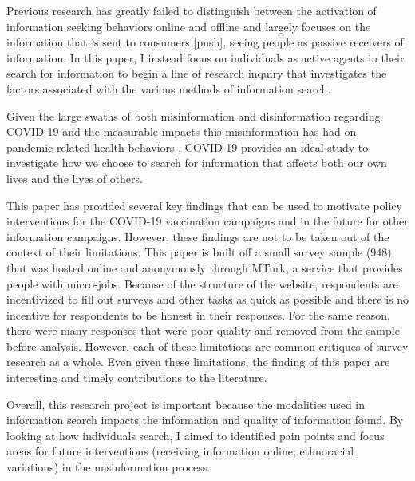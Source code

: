 Previous research has greatly failed to distinguish between the activation of
information seeking behaviors online and offline and largely focuses on the
information that is sent to consumers [push], seeing people as passive receivers
of information. In this paper, I instead focus on individuals as active agents
in their search for information to begin a line of research inquiry that
investigates the factors associated with the various methods of information
search.

Given the large swaths of both misinformation and disinformation regarding
COVID-19 \citep{pathakInfodemicsCOVID19Role2020, mottaHowRightLeaningMedia2020, shahsavariConspiracyTimeCorona2020} 
and the measurable impacts this misinformation has had on pandemic-related health behaviors
\citep{loombaMeasuringImpactCOVID192021, greene_murphy21}, COVID-19 provides an ideal study to
investigate how we choose to search for information that affects both our own
lives and the lives of others.

This paper has provided several key findings that can be used to motivate policy
interventions for the COVID-19 vaccination campaigns and in the future for other
information campaigns. However, these findings are not to be taken out of the
context of their limitations. This paper is built off a small survey sample (948)
that was hosted online and anonymously through MTurk, a service
that provides people with micro-jobs. Because of the structure of the website,
respondents are incentivized to fill out surveys and other tasks 
as quick as possible and there is no incentive for respondents to be honest
in their responses. For the same reason, there were many responses that 
were poor quality and removed from the sample before analysis.
However, each of these limitations are common critiques of 
survey research as a whole. Even given these limitations,
the finding of this paper are interesting and timely contributions to the literature.

Overall, this research project is important because the modalities used in
information search impacts the information and quality of information found. By
looking at how individuals search, I aimed to identified pain points and focus areas
for future interventions (receiving information online; ethnoracial variations) 
in the misinformation process.